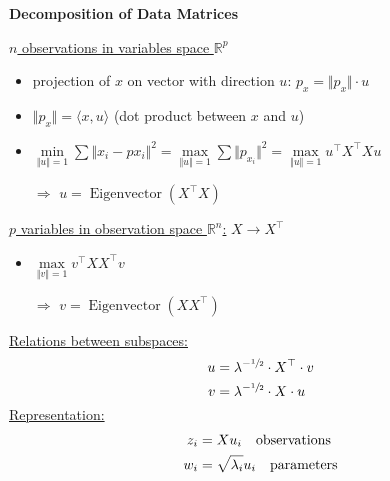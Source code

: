 \documentclass[10pt,landscape,a4paper]{article}
\DeclareMathOperator{\Eigenvector}{Eigenvector}
\begin{document}
\begin{multicols*}{4}
\begin{center}
	\normalsize{\textbf{Decomposition of Data Matrices}} \\
\end{center}
\underline{$n$ observations in variables space $\mathbb{R}^p$}
\begin{itemize}
	\item projection of $x$ on vector with direction $u$: $p_x = \Vert p_x\Vert \cdot u$
	\item $\Vert p_x\Vert = \langle x,u\rangle$ (dot product between $x$ and $u$)
	\item $\min\limits_{\Vert u\Vert = 1} \sum \Vert x_i - p{x_i}\Vert^2 = \max\limits_{\Vert u\Vert = 1} \sum \Vert p_{x_i}\Vert^2 = \max\limits_{\Vert u\Vert = 1} u^\top X^\top X u$
	\item[$\Rightarrow$] $u = \Eigenvector(X^\top X)$
\end{itemize}
\underline{$p$ variables in observation space $\mathbb{R}^n$:} $X\to X^\top$
\begin{itemize}
	\item $\max\limits_{\Vert v\Vert = 1} v^\top XX^\top v$
	\item[$\Rightarrow$] $v = \Eigenvector(XX^\top)$
\end{itemize}
\underline{Relations between subspaces:}
\begin{align}
	 u &= \lambda^{-\sfrac{1}{2}}\cdot X^\top\cdot v \notag \\
	 v &= \lambda^{-\sfrac{1}{2}}\cdot X\cdot u \notag
\end{align}
\underline{Representation:}
\begin{align}
	z_i &= Xu_i \quad\text{observations} \notag \\
	w_i &= \sqrt{\lambda_i}u_i \quad\text{parameters} \notag
\end{align}


\end{multicols*}
\end{document}
